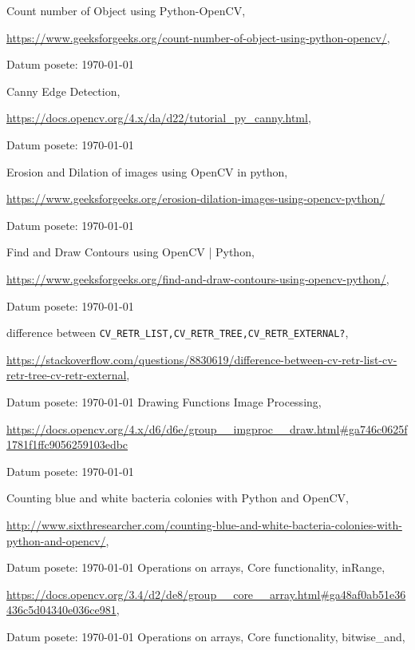 \documentclass[fontsize=12bp, paper=a4]{scrarticle}
\begin{document}
\newpage
\begin{thebibliography}{1}
    Count number of Object using Python-OpenCV,

    \url{https://www.geeksforgeeks.org/count-number-of-object-using-python-opencv/}, 
    
    Datum posete: \today

    Canny Edge Detection,
    
    \url{https://docs.opencv.org/4.x/da/d22/tutorial_py_canny.html},
    
    Datum posete: \today

    Erosion and Dilation of images using OpenCV in python,

    \url{https://www.geeksforgeeks.org/erosion-dilation-images-using-opencv-python/}

    Datum posete: \today
    
    Find and Draw Contours using OpenCV | Python,

    \url{https://www.geeksforgeeks.org/find-and-draw-contours-using-opencv-python/},

    Datum posete: \today

    difference between \verb|CV_RETR_LIST,CV_RETR_TREE,CV_RETR_EXTERNAL?|,

    \url{https://stackoverflow.com/questions/8830619/difference-between-cv-retr-list-cv-retr-tree-cv-retr-external},

    Datum posete: \today
    Drawing Functions Image Processing, 

    \url{https://docs.opencv.org/4.x/d6/d6e/group__imgproc__draw.html#ga746c0625f1781f1ffc9056259103edbc}

    Datum posete: \today

    Counting blue and white bacteria colonies with Python and OpenCV,

    \url{http://www.sixthresearcher.com/counting-blue-and-white-bacteria-colonies-with-python-and-opencv/},

    Datum posete: \today
    Operations on arrays, Core functionality, inRange,

    \url{https://docs.opencv.org/3.4/d2/de8/group__core__array.html#ga48af0ab51e36436c5d04340e036ce981},

    Datum posete: \today
    Operations on arrays, Core functionality, bitwise\_and,


\end{thebibliography}
\end{document}
